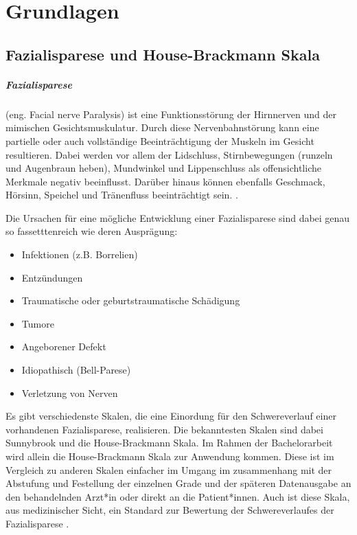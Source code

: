 \chapter{Grundlagen}\label{basics}
\section{Fazialisparese und House-Brackmann Skala}\label{facialpalsy}
\paragraph{Fazialisparese} (eng. Facial nerve Paralysis) ist eine Funktionsstörung der Hirnnerven und der mimischen Gesichtsmuskulatur. Durch diese Nervenbahnstörung kann eine partielle oder auch vollständige Beeinträchtigung der Muskeln im Gesicht resultieren. Dabei werden vor allem der Lidschluss, Stirnbewegungen (runzeln und Augenbraun heben), Mundwinkel und Lippenschluss als offensichtliche Merkmale negativ beeinflusst. Darüber hinaus können ebenfalls Geschmack, Hörsinn, Speichel und Tränenfluss beeinträchtigt sein. \cite{facialpalsy_1}\cite{facialpalsy_2}.

Die Ursachen für eine mögliche Entwicklung einer Fazialisparese sind dabei genau so fassetttenreich wie deren Ausprägung:
\begin{itemize}
  \setlength\itemsep{-0.5em}
\item Infektionen (z.B. Borrelien)
\item Entzündungen
\item Traumatische oder geburtstraumatische
Schädigung
\item Tumore
\item Angeborener Defekt
\item Idiopathisch (Bell-Parese)
\item Verletzung von Nerven
\end{itemize}

Es gibt verschiedenste Skalen, die eine Einordung für den Schwereverlauf einer vorhandenen Fazialisparese, realisieren. Die bekanntesten Skalen sind dabei Sunnybrook und die House-Brackmann Skala. Im Rahmen der Bachelorarbeit wird allein die House-Brackmann Skala zur Anwendung kommen. Diese ist im Vergleich zu anderen Skalen einfacher im Umgang im zusammenhang mit der Abstufung und Festellung der einzelnen Grade und der späteren Datenausgabe an den behandelnden Arzt*in oder direkt an die Patient*innen. Auch ist diese Skala, aus medizinischer Sicht, ein Standard zur Bewertung der Schwereverlaufes der Fazialisparese \cite{Mothes2019}.




